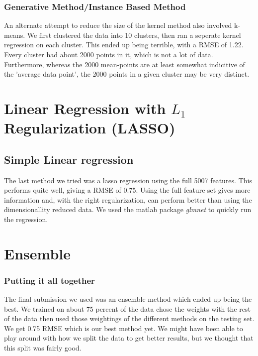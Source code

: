 \documentclass[a4paper,10pt]{article}
\begin{document}
\subsubsection*{Generative Method/Instance Based Method}
An alternate attempt to reduce the size of the kernel method also involved k-means. We first clustered the data into 10 clusters, then ran a seperate kernel regression on each cluster. This ended up being terrible, with a RMSE of 1.22. Every cluster had about 2000 points in it, which is not a lot of data. Furthermore, whereas the 2000 mean-points are at least somewhat indicitive of the 'average data point', the 2000 points in a given cluster may be very distinct.

\section{Linear Regression with $L_1$ Regularization (LASSO)}
\subsection*{Simple Linear regression}
The last method we tried was a lasso regression using the full 5007 features. This performs quite well, giving a RMSE of 0.75. Using the full feature set gives more information and, with the right regularization, can perform better than using the dimensionallity reduced data. We used the matlab package \emph{glmnet} to quickly run the regression.

\section{Ensemble}
\subsubsection*{Putting it all together}
The final submission we used was an ensemble method which ended up being the best. We trained on about 75 percent of the data chose the weights with the rest of the data then used those weightings of the different methods on the testing set. We get 0.75 RMSE which is our best method yet. We might have been able to play around with how we split the data to get better results, but we thought that this split was fairly good.
\end{document}
